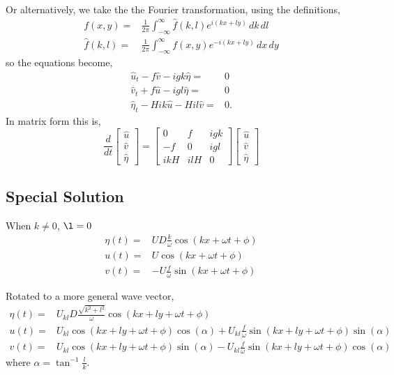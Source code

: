 \documentclass[11pt]{article}
\begin{document}
Or alternatively, we take the the Fourier transformation, using the definitions,
\begin{align}
f(x,y)=& \frac{1}{2\pi} \int_{-\infty}^{\infty} \hat{f}(k,l) e^{i(kx+ly)} \, dk\, dl \\
\hat{f}(k,l)=& \frac{1}{2\pi} \int_{-\infty}^{\infty} f(x,y) e^{-i(kx+ly)} \, dx\, dy
\end{align}
so the equations become,
\begin{align}
\hat{u}_t  -f \hat{v} - i g k \hat{\eta} =& 0 \\
\hat{v}_t + f \hat{u} - i g l \hat{\eta} =& 0 \\
\hat{\eta}_t - H i k \hat{u} - H i l \hat{v} =&0.
\end{align}
In matrix form this is,
\begin{equation}
\frac{d}{dt} \left[\begin{array}{c} \hat{u} \\ \hat{v} \\ \hat{\eta} \end{array}\right]
= \left[\begin{array}{ccc}0 & f & igk \\-f & 0 & igl \\ ikH & ilH & 0\end{array}\right]
\left[\begin{array}{c} \hat{u} \\ \hat{v} \\ \hat{\eta} \end{array}\right]
\end{equation}

%
\subsection{Special Solution}
%
When $k\neq0$, $\l=0$
\begin{align}
\eta(t) =& U D \frac{k}{\omega} \cos( kx + \omega t + \phi) \\
u(t) =& U\cos( kx + \omega t + \phi) \\
v(t) =& - U \frac{f}{\omega} \sin( kx + \omega t + \phi)
\end{align}

Rotated to a more general wave vector,
\begin{align}
\eta(t) =& U_{kl} D \frac{\sqrt{k^2+l^2}}{\omega} \cos( kx + ly + \omega t + \phi) \\
u(t) =& U_{kl} \cos( kx + ly + \omega t + \phi) \cos( \alpha) + U_{kl} \frac{f}{\omega} \sin( kx + ly + \omega t + \phi) \sin(\alpha) \\
v(t) =& U_{kl} \cos( kx + ly + \omega t + \phi) \sin(\alpha) - U_{kl} \frac{f}{\omega} \sin( kx + ly + \omega t + \phi) \cos( \alpha) 
\end{align}
where $\alpha = \tan^{-1} \frac{l}{k}$.
\end{document}
